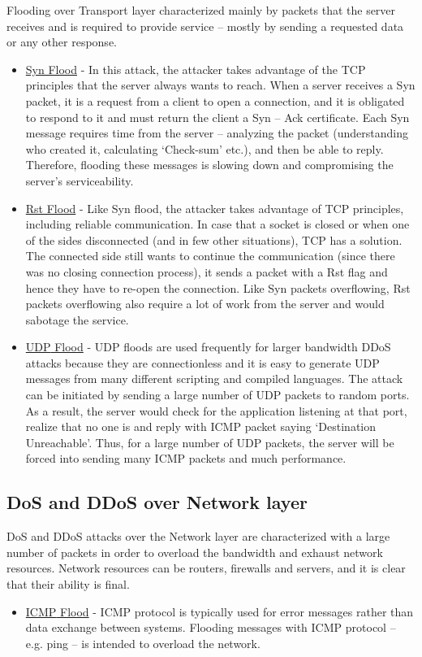 \documentclass{report}
\begin{document}
 Flooding over Transport layer characterized mainly by packets that the server receives and is required to provide service – mostly by sending a requested data or any other response\cite{QuickGuide}.\begin{itemize}
 \item\underline{Syn Flood} - In this attack, the attacker takes advantage of the \gls{TCP} principles that the server always wants to reach. When a server receives a Syn packet, it is a request from a client to open a connection, and it is obligated to respond to it and must return the client a Syn – Ack certificate. Each Syn message requires time from the server – analyzing the packet (understanding who created it, calculating ‘Check-sum’ etc.), and then be able to reply. Therefore, flooding these messages is slowing down and compromising the server’s serviceability.

\item\underline{Rst Flood} - Like Syn flood, the attacker takes advantage of \gls{TCP} principles, including reliable communication. In case that a socket is closed or when one of the sides disconnected (and in few other situations), \gls{TCP} has a solution. The connected side still wants to continue the communication (since there was no closing connection process), it sends a packet with a Rst flag and hence they have to re-open the connection. Like Syn packets overflowing, Rst packets overflowing also require a lot of work from the server and would sabotage the service.

\item\underline{\gls{UDP} Flood} - \gls{UDP} floods are used frequently for larger bandwidth \gls{DDoS} attacks because they are connectionless and it is easy to generate \gls{UDP} messages from many different scripting and compiled languages. The attack can be initiated by sending a large number of \gls{UDP} packets to random ports. As a result, the server would check for the application listening at that port, realize that no one is and reply with \gls{ICMP} packet saying ‘Destination Unreachable’. Thus, for a large number of \gls{UDP} packets, the server will be forced into sending many \gls{ICMP} packets and much performance.
\end{itemize}
\newpage
\subsection {DoS and DDoS over Network layer} 

 \hfill \break \gls{DoS} and \gls{DDoS} attacks over the Network layer are characterized with a large number of packets in order to overload the bandwidth and exhaust network resources. Network resources can be routers, firewalls and servers, and it is clear that their ability is final.
\begin{itemize}
\item\underline{\gls{ICMP} Flood} - \gls{ICMP} protocol is typically used for error messages rather than data exchange between systems. Flooding messages with \gls{ICMP} protocol – e.g. ping – is intended to overload the network.
\end{itemize}
 \hfill \break
\end{document}
